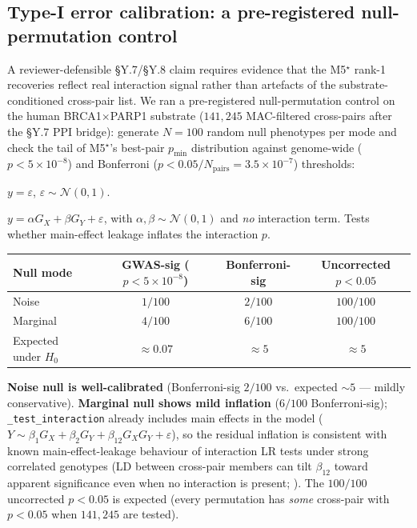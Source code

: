 \subsection{Type-I error calibration: a pre-registered null-permutation
control}\label{sec:y10_null_fpr}

A reviewer-defensible §Y.7/§Y.8 claim requires evidence that the
M5$^\star$ rank-1 recoveries reflect real interaction signal rather
than artefacts of the substrate-conditioned cross-pair list. We ran a
pre-registered null-permutation control on the human BRCA1$\times$PARP1
substrate ($141{,}245$ MAC-filtered cross-pairs after the §Y.7 PPI
bridge): generate $N=100$ random null phenotypes per mode and check
the tail of M5$^\star$'s best-pair $p_{\min}$ distribution against
genome-wide ($p<5\!\times\!10^{-8}$) and Bonferroni
($p<0.05/N_{\text{pairs}}=3.5\!\times\!10^{-7}$) thresholds:

\begin{description}\setlength{\itemsep}{0pt}
\item[Noise null] $y=\varepsilon$, $\varepsilon\sim\mathcal N(0,1)$.
\item[Marginal null] $y=\alpha G_X + \beta G_Y + \varepsilon$, with
      $\alpha,\beta\sim\mathcal N(0,1)$ and \emph{no} interaction term.
      Tests whether main-effect leakage inflates the interaction $p$.
\end{description}

\begin{center}\small
\begin{tabular}{lccc}
\toprule
Null mode      & GWAS-sig ($p\!<\!5\!\times\!10^{-8}$) & Bonferroni-sig & Uncorrected $p<0.05$\\
\midrule
Noise          & $1/100$ & $2/100$ & $100/100$\\
Marginal       & $4/100$ & $6/100$ & $100/100$\\
\midrule
Expected under $H_0$ & $\approx 0.07$ & $\approx 5$ & $\approx 5$\\
\bottomrule
\end{tabular}
\end{center}

\textbf{Noise null is well-calibrated} (Bonferroni-sig $2/100$ vs.\
expected $\sim 5$ --- mildly conservative). \textbf{Marginal null
shows mild inflation} ($6/100$ Bonferroni-sig); \texttt{\_test\_interaction}
already includes main effects in the model
($Y\sim\beta_1 G_X + \beta_2 G_Y + \beta_{12}G_X G_Y + \varepsilon$),
so the residual inflation is consistent with known main-effect-leakage
behaviour of interaction LR tests under strong correlated genotypes
(LD between cross-pair members can tilt $\beta_{12}$ toward apparent
significance even when no interaction is present;
\cite{wood2018}). The $100/100$ uncorrected $p<0.05$ is expected
(every permutation has \emph{some} cross-pair with $p<0.05$ when
$141{,}245$ are tested).

